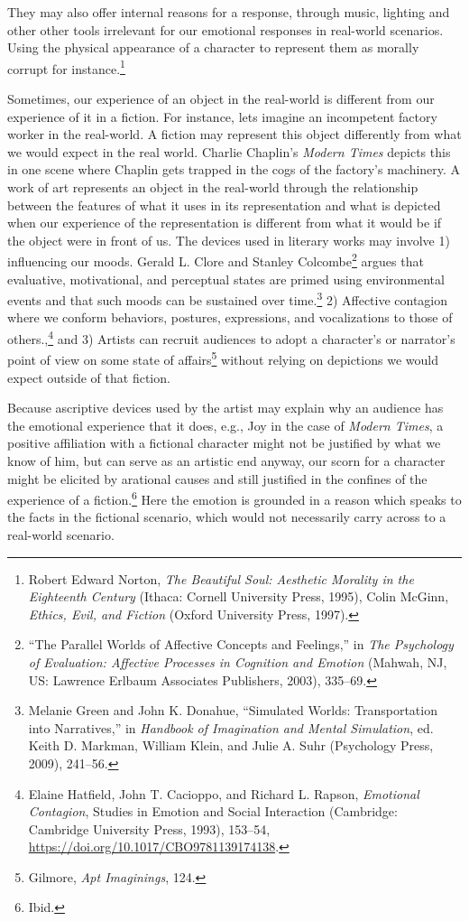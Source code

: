 \documentclass[phdthesis,12pt,final]{wuthesis}
\theoremstyle{definition}
\theoremstyle{definition}
\theoremstyle{definition}
\theoremstyle{definition}
\theoremstyle{remark}
\begin{document}
They may also offer internal reasons for a response, through music, lighting and other other tools irrelevant for our emotional responses in real-world scenarios. Using the physical appearance of a character to represent them as morally corrupt for instance.\footnote{Robert Edward Norton, \emph{The Beautiful Soul: Aesthetic Morality in the Eighteenth Century} (Ithaca: Cornell University Press, 1995), Colin McGinn, \emph{Ethics, {Evil}, and {Fiction}} (Oxford University Press, 1997).}

Sometimes, our experience of an object in the real-world is different from our experience of it in a fiction. For instance, lets imagine an incompetent factory worker in the real-world. A fiction may represent this object differently from what we would expect in the real world. Charlie Chaplin's \emph{Modern Times} depicts this in one scene where Chaplin gets trapped in the cogs of the factory's machinery. A work of art represents an object in the real-world through the relationship between the features of what it uses in its representation and what is depicted when our experience of the representation is different from what it would be if the object were in front of us. The devices used in literary works may involve 1) influencing our moods. Gerald L. Clore and Stanley Colcombe\footnote{{``The Parallel Worlds of Affective Concepts and Feelings,''} in \emph{The Psychology of Evaluation: {Affective} Processes in Cognition and Emotion} (Mahwah, NJ, US: Lawrence Erlbaum Associates Publishers, 2003), 335--69.} argues that evaluative, motivational, and perceptual states are primed using environmental events and that such moods can be sustained over time.\footnote{Melanie Green and John K. Donahue, {``Simulated {Worlds}: {Transportation} into {Narratives},''} in \emph{Handbook of {Imagination} and {Mental Simulation}}, ed. Keith D. Markman, William Klein, and Julie A. Suhr (Psychology Press, 2009), 241--56.} 2) Affective contagion where we conform behaviors, postures, expressions, and vocalizations to those of others.,\footnote{Elaine Hatfield, John T. Cacioppo, and Richard L. Rapson, \emph{Emotional {Contagion}}, Studies in {Emotion} and {Social Interaction} (Cambridge: Cambridge University Press, 1993), 153--54, \url{https://doi.org/10.1017/CBO9781139174138}.} and 3) Artists can recruit audiences to adopt a character's or narrator's point of view on some state of affairs\footnote{Gilmore, \emph{Apt {Imaginings}}, 124.} without relying on depictions we would expect outside of that fiction.

Because ascriptive devices used by the artist may explain why an audience has the emotional experience that it does, e.g., Joy in the case of \emph{Modern Times}, a positive affiliation with a fictional character might not be justified by what we know of him, but can serve as an artistic end anyway, our scorn for a character might be elicited by arational causes and still justified in the confines of the experience of a fiction.\footnote{Ibid.} Here the emotion is grounded in a reason which speaks to the facts in the fictional scenario, which would not necessarily carry across to a real-world scenario.
\end{document}

